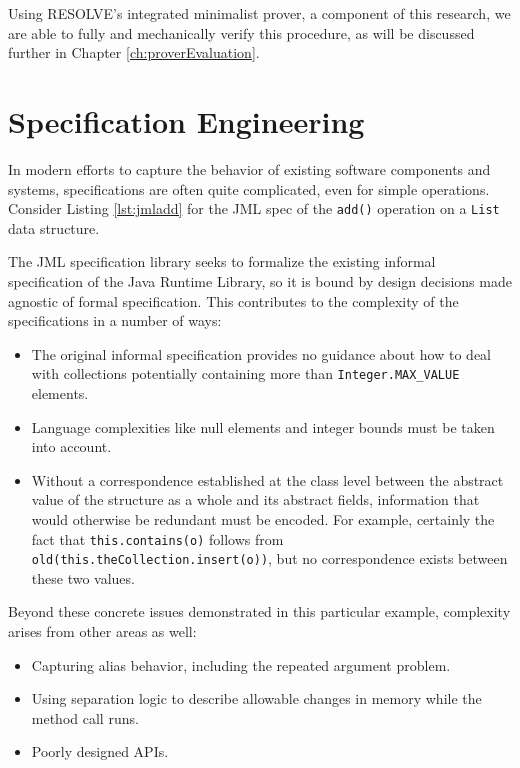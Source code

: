 Using RESOLVE's integrated minimalist prover, a component of this research, we are able to fully and mechanically verify this procedure, as will be discussed further in Chapter \ref{ch:proverEvaluation}.


\section{Specification Engineering}

In modern efforts to capture the behavior of existing software components and systems, specifications are often quite complicated, even for simple operations.  Consider Listing \ref{lst:jmladd} for the JML spec of the \texttt{add()} operation on a \texttt{List} data structure.



The JML specification library seeks to formalize the existing informal specification of the Java Runtime Library, so it is bound by design decisions made agnostic of formal specification.  This contributes to the complexity of the specifications in a number of ways:

\begin{itemize}
	\item The original informal specification provides no guidance about how to deal with collections potentially containing more than \texttt{Integer.MAX\_VALUE} elements.
	\item Language complexities like null elements and integer bounds must be taken into account.
	\item Without a correspondence established at the class level between the abstract value of the structure as a whole and its abstract fields, information that would otherwise be redundant must be encoded.  For example, certainly the fact that \texttt{this.contains(o)} follows from \texttt{\\old(this.theCollection.insert(o))}, but no correspondence exists between these two values.
\end{itemize}

Beyond these concrete issues demonstrated in this particular example, complexity arises from other areas as well:

\begin{itemize}
	\item Capturing alias behavior, including the repeated argument problem.
	\item Using separation logic to describe allowable changes in memory while the method call runs.
	\item Poorly designed APIs.
\end{itemize}

